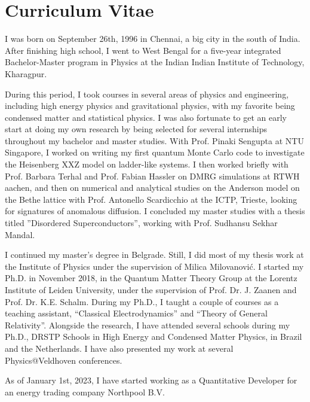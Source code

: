 \newpage
\thispagestyle{empty}

\chapter*{Curriculum Vitae} %
\label{Curriculum Vitae}

I was born on September 26th, 1996 in Chennai, a big city in the south of India. After finishing high school, I went to West Bengal for a five-year integrated Bachelor-Master program in Physics at the Indian Indian Institute of Technology, Kharagpur.
\par
During this period, I took courses in several areas of physics and engineering, including high energy physics and gravitational physics, with my favorite being condensed matter and statistical physics. I was also fortunate to get an early start at doing my own research by being selected for several internships throughout my bachelor and master studies. With Prof. Pinaki Sengupta at NTU Singapore, I worked on writing my first quantum Monte Carlo code to investigate the Heisenberg XXZ model on ladder-like systems. I then worked briefly with Prof. Barbara Terhal and Prof. Fabian Hassler on DMRG simulations at RTWH aachen, and then on numerical and analytical studies on the Anderson model on the Bethe lattice with Prof. Antonello Scardicchio at the ICTP, Trieste, looking for signatures of anomalous diffusion. I concluded my master studies with a thesis titled ''Disordered Superconductors'', working with Prof. Sudhansu Sekhar Mandal. 
\par
I continued my master's degree in Belgrade. Still, I did most of my thesis work at the Institute of Physics under the supervision of Milica Milovanović. 
I started my Ph.D. in November 2018, in the Quantum Matter Theory Group at the Lorentz Institute of Leiden University, under the supervision of Prof. Dr. J. Zaanen and Prof. Dr. K.E. Schalm. During my Ph.D., I taught a couple of courses as a teaching assistant, ``Classical Electrodynamics'' and ``Theory of General Relativity''. Alongside the research, I have attended several schools during my Ph.D., DRSTP Schools in High Energy and Condensed Matter Physics, in Brazil and the Netherlands. I have also presented my work at several Physics@Veldhoven conferences.


As of January 1st, 2023, I have started working as a Quantitative Developer for an energy trading company Northpool B.V.


\newpage
\thispagestyle{empty}